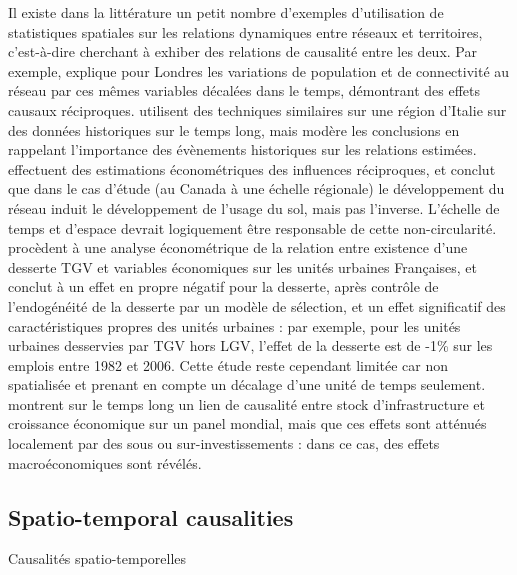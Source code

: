 {Il existe dans la littérature un petit nombre d'exemples d'utilisation de statistiques spatiales sur les relations dynamiques entre réseaux et territoires, c'est-à-dire cherchant à exhiber des relations de causalité entre les deux. Par exemple, \cite{levinson2008density} explique pour Londres les variations de population et de connectivité au réseau par ces mêmes variables décalées dans le temps, démontrant des effets causaux réciproques. \cite{doi:10.1068/b39089} utilisent des techniques similaires sur une région d'Italie sur des données historiques sur le temps long, mais modère les conclusions en rappelant l'importance des évènements historiques sur les relations estimées. \cite{cuthbert2005empirical} effectuent des estimations économétriques des influences réciproques, et conclut que dans le cas d'étude (au Canada à une échelle régionale) le développement du réseau induit le développement de l'usage du sol, mais pas l'inverse. L'échelle de temps et d'espace devrait logiquement être responsable de cette non-circularité. \cite{koning:hal-00962384} procèdent à une analyse économétrique de la relation entre existence d'une desserte TGV et variables économiques sur les unités urbaines Françaises, et conclut à un effet en propre négatif pour la desserte, après contrôle de l'endogénéité de la desserte par un modèle de sélection, et un effet significatif des caractéristiques propres des unités urbaines : par exemple, pour les unités urbaines desservies par TGV hors LGV, l'effet de la desserte est de -1\% sur les emplois entre 1982 et 2006. Cette étude reste cependant limitée car non spatialisée et prenant en compte un décalage d'une unité de temps seulement. \cite{MANC:MANC1073} montrent sur le temps long un lien de causalité entre stock d'infrastructure et croissance économique sur un panel mondial, mais que ces effets sont atténués localement par des sous ou sur-investissements : dans ce cas, des effets macroéconomiques sont révélés.
}





\subsection{Spatio-temporal causalities}{Causalités spatio-temporelles}


